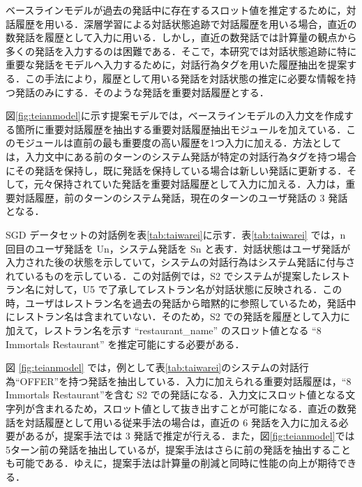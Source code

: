 ベースラインモデルが過去の発話中に存在するスロット値を推定するために，対話履歴を用いる．深層学習による対話状態追跡で対話履歴を用いる場合，直近の数発話を履歴として入力に用いる\cite{trade,mrc}．しかし，直近の数発話では計算量の観点から多くの発話を入力するのは困難である．そこで，本研究では対話状態追跡に特に重要な発話をモデルへ入力するために，対話行為タグを用いた履歴抽出を提案する．この手法により，履歴として用いる発話を対話状態の推定に必要な情報を持つ発話のみにする．そのような発話を重要対話履歴とする．
\par

図\ref{fig:teianmodel}に示す提案モデルでは，ベースラインモデルの入力文を作成する箇所に重要対話履歴を抽出する重要対話履歴抽出モジュールを加えている．このモジュールは直前の最も重要度の高い履歴を1つ入力に加える．方法としては，入力文中にある前のターンのシステム発話が特定の対話行為タグを持つ場合にその発話を保持し，既に発話を保持している場合は新しい発話に更新する．そして，元々保持されていた発話を重要対話履歴として入力に加える．入力は，重要対話履歴，前のターンのシステム発話，現在のターンのユーザ発話の 3 発話となる．
\par
SGD データセットの対話例を表\ref{tab:taiwarei}に示す．表\ref{tab:taiwarei} では，n 回目のユーザ発話を Un，システム発話を Sn と表す．対話状態はユーザ発話が入力された後の状態を示していて，システムの対話行為はシステム発話に付与されているものを示している．この対話例では，S2 でシステムが提案したレストラン名に対して，U5 で了承してレストラン名が対話状態に反映される．この時，ユーザはレストラン名を過去の発話から暗黙的に参照しているため，発話中にレストラン名は含まれていない．そのため，S2 での発話を履歴として入力に加えて，レストラン名を示す “restaurant\_name” のスロット値となる “8 Immortals Restaurant” を推定可能にする必要がある．
\par
図 \ref{fig:teianmodel} では，例として表\ref{tab:taiwarei}のシステムの対話行為“OFFER”を持つ発話を抽出している．入力に加えられる重要対話履歴は，“8 Immortals Restaurant”を含む S2 での発話になる．入力文にスロット値となる文字列が含まれるため，スロット値として抜き出すことが可能になる．直近の数発話を対話履歴として用いる従来手法の場合は，直近の 6 発話を入力に加える必要があるが，提案手法では 3 発話で推定が行える．また，図\ref{fig:teianmodel}では5ターン前の発話を抽出しているが，提案手法はさらに前の発話を抽出することも可能である．ゆえに，提案手法は計算量の削減と同時に性能の向上が期待できる．